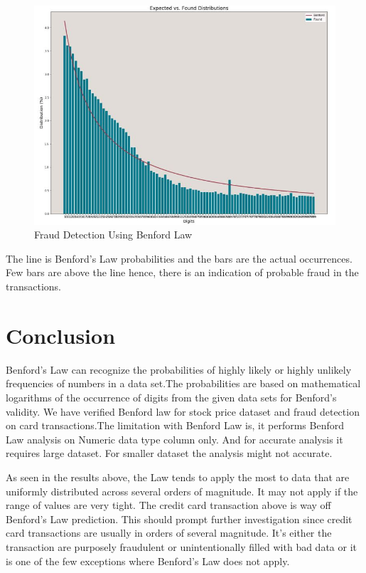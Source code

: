 \begin{figure}[!ht]
\centering\includegraphics[width=\columnwidth]{images/ben_card_trx.JPG}
  \caption{Fraud Detection Using Benford Law}\label{f:card-ds-benfordlaw}
\end{figure}

The line is Benford’s Law probabilities and the bars are 
the actual occurrences. Few bars are above the line hence,
there is an indication of probable fraud in the transactions.


\section{Conclusion}
Benford’s Law can recognize the probabilities of highly  likely or 
highly unlikely frequencies of numbers in a data set.The 
probabilities are based on mathematical logarithms of the occurrence 
of digits from the given data sets for Benford's validity. We have 
verified Benford law for stock price dataset and fraud detection on 
card transactions.The limitation with Benford Law is, it performs 
Benford Law analysis on Numeric data type column only. 
And for accurate analysis it requires large dataset.
For smaller dataset the analysis might not accurate.

As seen in the results above, the Law tends to apply the most 
to data that are uniformly distributed across several orders of magnitude. 
It may not apply if the range of values are very tight. 
The credit card transaction above is way off Benford’s 
Law prediction. This should prompt further investigation 
since credit card transactions are usually in orders of several 
magnitude. It’s either the transaction are purposely fraudulent 
or unintentionally filled with bad data or it is one 
of the few exceptions where Benford’s Law does not apply.



 
